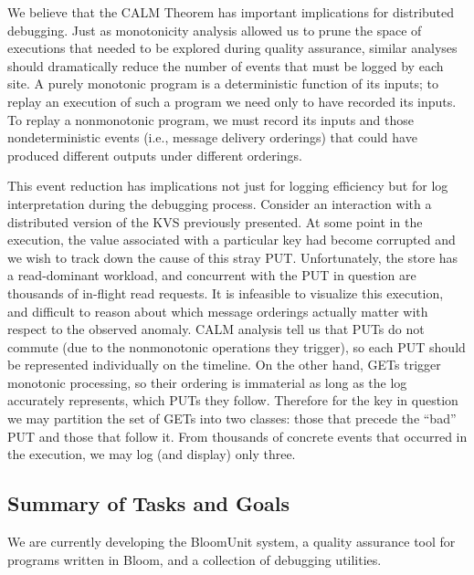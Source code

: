 We believe that the CALM Theorem has important implications for distributed debugging.
Just as monotonicity analysis allowed us to prune the space of executions that needed to be
explored during quality assurance, similar analyses should dramatically reduce the number of events
that must be logged by each site.  A purely monotonic program is a deterministic function of its inputs;
to replay an execution of such a program we need only to have recorded its inputs.  To replay a nonmonotonic 
program, we must record its inputs and those nondeterministic events (i.e., message delivery orderings) 
that could have produced different outputs under different orderings.  

This event reduction has implications not just for logging efficiency but for log interpretation during
the debugging process.  Consider an interaction with a distributed version of the KVS previously presented.
At some point in the execution, the value associated with a particular key had become corrupted and we wish
to track down the cause of this stray PUT.  Unfortunately, the store has a read-dominant workload, and concurrent 
with the PUT in question are thousands of in-flight read requests.  It is infeasible to visualize this execution,
and difficult to reason about which message orderings actually matter with respect to the observed anomaly.
CALM analysis tell us that PUTs do not commute (due to the nonmonotonic operations they trigger), so each PUT
should be represented individually on the timeline.  On the other hand, GETs trigger monotonic processing, so
their ordering is immaterial as long as the log accurately represents, which PUTs they follow.
Therefore for the key in question we may partition the set of GETs into two classes: those that precede the ``bad''
PUT and those that follow it.  From thousands of concrete events that occurred in the execution, we may log (and
display) only three.



\subsection{Summary of Tasks and Goals}

We are currently developing the BloomUnit system, a quality assurance tool
for programs written in Bloom, and a collection of debugging utilities.


